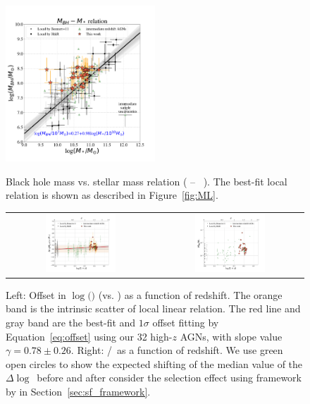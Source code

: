 \documentclass[apj]{emulateapj}
\begin{document}
\begin{figure}
\centering
{
\includegraphics[width=0.5\textwidth]{fig/MBH-Mstar.pdf}
}
\caption{\label{fig:MM} 
Black hole mass vs. stellar mass relation ( \mbh -- \smass\ ). The best-fit local relation is shown as described in Figure~\ref{fig:ML}.
}
\end{figure} 

\begin{figure}
\centering
\begin{tabular}{c c}
{\includegraphics[width=0.5\textwidth]{fig/MBH-Mstar-vz_style1.pdf}}&
{\includegraphics[width=0.5\textwidth]{fig/MBH-Mstar-vz_style0.pdf}}\\
\end{tabular}
\caption{\label{fig:MM-vz} 
Left: Offset in  $\log($\mbh$)$ (vs. \smass) as a function of redshift. The orange band is the intrinsic scatter of local linear relation. The red line and gray band are the best-fit and $1\sigma$ offset fitting by Equation~\ref{eq:offset} using our 32 high-$z$ AGNs, with slope value $\gamma  = 0.78 \pm 0.26$.
Right: \mbh/\smass\ as a function of redshift. 
We use green open circles to show the expected shifting of the median value of the $\Delta \log$\mbh\ before and after consider the selection effect using framework by \citet{Schulze2011} in Section~\ref{sec:sf_framework}.}
\end{figure} 
\end{document}
